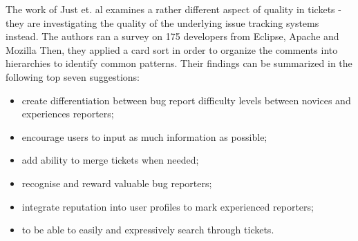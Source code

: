 \documentclass{mpaper}
\begin{document}
The work of Just et. al \cite{just2008towards} examines a rather different aspect
of quality in tickets - they are investigating the quality of the underlying issue 
tracking systems instead. 
The authors ran a survey on 175 developers from Eclipse, Apache and Mozilla
Then, they applied a card sort in order to organize the comments into hierarchies to 
identify common patterns. Their findings can be summarized in the following top seven
suggestions:
  \begin{itemize}
    \item create differentiation between bug report difficulty levels between 
    novices and experiences reporters;
    \item encourage users to input as much information as possible;
    \item add ability to merge tickets when needed;
    \item recognise and reward valuable bug reporters;
    \item integrate reputation into user profiles to mark experienced reporters;
    \item to be able to easily and expressively search through tickets.
  \end{itemize}
\end{document}
